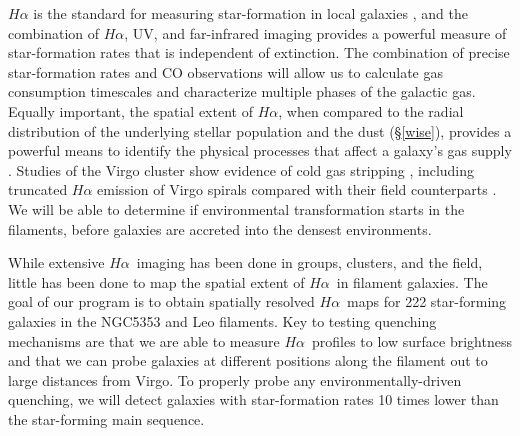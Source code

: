 \documentclass[11pt, preprint]{aastex}
\newcommand{\ha}{$H\alpha$}
\begin{document}
$H\alpha$ is the standard for measuring star-formation in local galaxies
\citep[e.g.][]{kennicutt98}, and the combination of \ha, UV, 
and far-infrared imaging provides a powerful measure of star-formation
rates that is independent of extinction.  The
combination of precise star-formation rates and CO observations will allow us to calculate
gas consumption timescales and characterize multiple phases of the
galactic gas. 
Equally important, the spatial extent of \ha, when compared to the
radial distribution of the underlying stellar population and the dust (\S\ref{wise}), provides a powerful
means to identify the physical processes that affect a galaxy's gas
supply \citep[e.g.][]{hodge83, dale01, gavazzi12,boselli15}.
Studies of the Virgo cluster show evidence of cold gas stripping
\citep[e.g.][]{crowl05, chung07, corbelli12, gavazzi12, boselli15}, including truncated $H\alpha$ emission of Virgo spirals
compared with their field counterparts \citep{koopmann04}.
We will be able to determine if environmental transformation starts in
the filaments, before galaxies are accreted into the densest environments.

While extensive \ha \ imaging has been done in groups, clusters, and the field,
little has been done to map the spatial extent of \ha \ in filament
galaxies.  
The goal of our program is to obtain spatially resolved \ha \ maps for 222 star-forming galaxies in
the NGC5353 and Leo filaments. Key to testing quenching mechanisms are that we are able to measure \ha \ profiles to low surface brightness and that we can
probe galaxies at different positions along the filament out to large
distances from Virgo.
To properly probe any environmentally-driven quenching, we will detect galaxies
with star-formation rates 10 times lower than the star-forming main sequence. 
\end{document}
